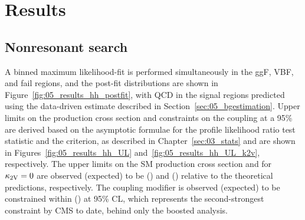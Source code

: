 


\section{Results}
\label{sec:05_results}

\subsection{Nonresonant \texorpdfstring{\HH}{HH} search}
\label{sec:05_results_hh}

A binned maximum likelihood-fit is performed simultaneously in the ggF, VBF, and fail regions, and the post-fit distributions are shown in Figure~\ref{fig:05_results_hh_postfit}, with QCD in the signal regions predicted using the data-driven estimate described in Section~\ref{sec:05_bgestimation}.
Upper limits on the \HH production cross section and constraints on the \kapvv coupling at a 95\% \CL are derived based on the asymptotic formulae for the profile likelihood ratio test statistic and the \CLs criterion, as described in Chapter~\ref{sec:03_stats} and are shown in Figures~\ref{fig:05_results_hh_UL} and~\ref{fig:05_results_hh_UL_k2v}, respectively. 
The upper limits on the SM \HH production cross section and for $\kappa_{2\textrm{V}}=0$ are observed (expected) to be \hhobs (\hhexp) and \cvvobs (\cvvexp) relative to the theoretical predictions, respectively.
The coupling modifier \kapvv is observed (expected) to be constrained within \kvvobslims (\kvvexplims) at 95\% CL, which represents the second-strongest constraint by CMS to date, behind only the boosted \bbbb analysis.

